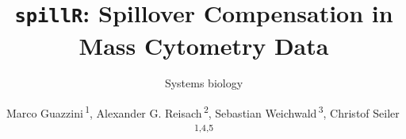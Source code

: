 \documentclass{bioinfo}
\begin{document}

\subtitle{Systems biology}

\title[\texttt{Spillover\ Compensation}]{\texttt{spillR}: Spillover
Compensation in Mass Cytometry Data}

\author[FirstAuthorLastName \textit{et~al}.]{
Marco Guazzini\,\textsuperscript{1}, Alexander G.
Reisach\,\textsuperscript{2}, Sebastian
Weichwald\,\textsuperscript{3}, Christof Seiler\,\textsuperscript{1,4,5}
}

\address{
\textsuperscript{1}Department of Advanced Computing Sciences, Maastricht
University, The Netherlands\\
\textsuperscript{2}Université Paris Cité, CNRS, MAP5, F-75006 Paris,
France\\
\textsuperscript{3}Department of Mathematical Sciences, University of
Copenhagen, Denmark\\
\textsuperscript{4}Mathematics Centre Maastricht, Maastricht University,
The Netherlands\\
\textsuperscript{5}Center of Experimental Rheumatology, Department of
Rheumatology, University Hospital Zurich, University of Zurich,
Switzerland\\
}



\end{document}
